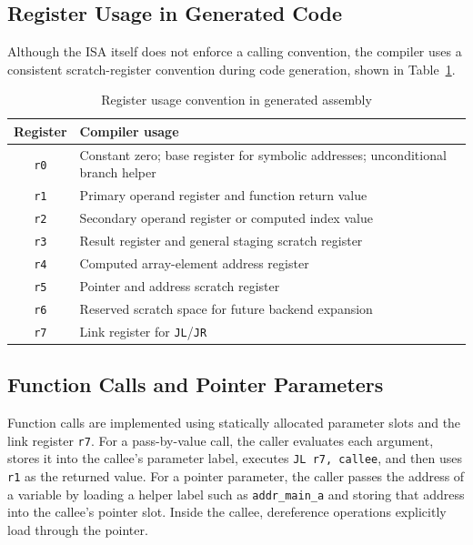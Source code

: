 \documentclass[12pt]{report}
\begin{document}
\subsection{Register Usage in Generated Code}

Although the ISA itself does not enforce a calling convention, the compiler
uses a consistent scratch-register convention during code generation, shown in
Table~\ref{tab:codegen-regs}.

\begin{table}[!htbp]
\centering
\begin{tabular}{cl}
\toprule
\textbf{Register} & \textbf{Compiler usage} \\
\midrule
\texttt{r0} & Constant zero; base register for symbolic addresses; unconditional branch helper \\
\texttt{r1} & Primary operand register and function return value \\
\texttt{r2} & Secondary operand register or computed index value \\
\texttt{r3} & Result register and general staging scratch register \\
\texttt{r4} & Computed array-element address register \\
\texttt{r5} & Pointer and address scratch register \\
\texttt{r6} & Reserved scratch space for future backend expansion \\
\texttt{r7} & Link register for \texttt{JL}/\texttt{JR} \\
\bottomrule
\end{tabular}
\caption{Register usage convention in generated assembly}
\label{tab:codegen-regs}
\end{table}

\subsection{Function Calls and Pointer Parameters}

Function calls are implemented using statically allocated parameter slots and
the link register \texttt{r7}. For a pass-by-value call, the caller evaluates
each argument, stores it into the callee's parameter label, executes
\texttt{JL r7, callee}, and then uses \texttt{r1} as the returned value. For a
pointer parameter, the caller passes the address of a variable by loading a
helper label such as \nolinkurl{addr_main_a} and storing that address into the
callee's pointer slot. Inside the callee, dereference operations explicitly
load through the pointer.
\end{document}
